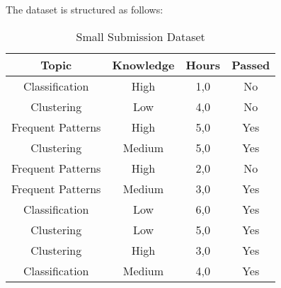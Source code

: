 \documentclass[
english,
smallborders
]{i6prcsht}
\begin{document}
The dataset is structured as follows:

\vspace*{1cm}

\begin{table}[ht]
	\centering
	\begin{tabular}{|c|c|c|c|}
		\hline
		\textbf{Topic}    & \textbf{Knowledge} & \textbf{Hours} & \textbf{Passed} \\ \hline
		Classification    & High               & 1,0            & No              \\ \hline
		Clustering        & Low                & 4,0            & No              \\ \hline
		Frequent Patterns & High               & 5,0            & Yes             \\ \hline
		Clustering        & Medium             & 5,0            & Yes             \\ \hline
		Frequent Patterns & High               & 2,0            & No              \\ \hline
		Frequent Patterns & Medium             & 3,0            & Yes             \\ \hline
		Classification    & Low                & 6,0            & Yes             \\ \hline
		Clustering        & Low                & 5,0            & Yes             \\ \hline
		Clustering        & High               & 3,0            & Yes             \\ \hline
		Classification    & Medium             & 4,0            & Yes             \\ \hline
	\end{tabular}
	\caption{Small Submission Dataset}
	\label{tab:small-submission-dataset}
\end{table}

\vspace*{1cm}
\end{document}
